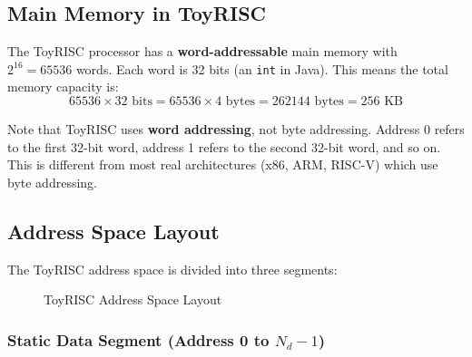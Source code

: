 \documentclass[12pt,a4paper]{article}
\begin{document}
\subsection{Main Memory in ToyRISC}

The ToyRISC processor has a \textbf{word-addressable} main memory with $2^{16} = 65536$ words. Each word is 32 bits (an \texttt{int} in Java). This means the total memory capacity is:
\[
65536 \times 32 \text{ bits} = 65536 \times 4 \text{ bytes} = 262144 \text{ bytes} = 256 \text{ KB}
\]

Note that ToyRISC uses \textbf{word addressing}, not byte addressing. Address 0 refers to the first 32-bit word, address 1 refers to the second 32-bit word, and so on. This is different from most real architectures (x86, ARM, RISC-V) which use byte addressing.

\subsection{Address Space Layout}

The ToyRISC address space is divided into three segments:

\begin{figure}[H]
\centering
{}
\caption{ToyRISC Address Space Layout}
\end{figure}

\subsubsection{Static Data Segment (Address 0 to $N_d - 1$)}
\end{document}
